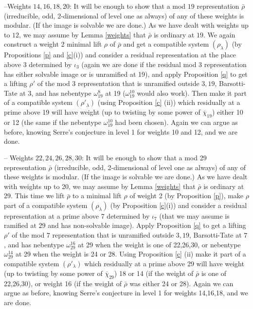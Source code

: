 \documentclass[12pt]{amsart}
\newcommand{\rhobar}{\overline{\rho}}
\def\rhobar{ {\bar {\rho} } }
\def\rhob{ {\bar {\rho} } }
\begin{document}
--Weights $14,16,18,20$: It will be enough to show that a mod $19$ representation $\rhob$ 
(irreducible, odd, $2$-dimensional of level one as always) of any of these weights is modular. (If the image is solvable we are done.) As we have 
dealt with weights up to $12$, we may assume by Lemma \ref{weights} that $\rhob$ is ordinary at $19$.
We again construct a weight 2 minimal lift $\rho$ of $\rhobar$ and get a compatible system $(\rho_{\lambda})$ (by Propositions \ref{p} and \ref{c}(i)) and consider a residual representation at the place above $3$
determined by $\iota_3$ (again we are done if the residual mod 3 representation has either solvable image or is unramified at 19), and apply Proposition \ref{q}
to get a lifting $\rho'$ of the mod 3 representation  that is unramified outside $3,19$, Barsotti-Tate at 3, and has nebentype
$\omega_{19}^8$ at 19 ($\omega_{19}^{10}$ would also work). Then make it part of a compatible system $(\rho'_{\lambda})$ (using Proposition \ref{c} (ii)) 
which residually at a prime above 19 will 
have weight (up to twisting by some power of $\overline \chi_{19}$) either 10 or 12 (the same if the nebentype $\omega_{19}^{10}$ had been chosen). Again we can argue as 
before, knowing Serre's conjecture in level 1 for weights 10 and 12,  and we are done.


-- Weights $22,24,26,28,30$: It will be enough to show that a mod 29 representation $\rhob$ (irreducible, odd, 2-dimensional of level one as always) of any of these weights is modular. (If the image is solvable we are done.) As we have dealt with weights up to 20, 
we may assume by Lemma \ref{weights} that $\rhob$ is ordinary at 29.
This time we lift $\rhobar$ to a minimal lift $\rho$ of weight 2
(by Proposition \ref{p}), make $\rho$ part of 
a  compatible system $(\rho_{\lambda})$ 
(by Proposition \ref{c}(i)) and 
consider a residual representation at a prime above 7 determined by $\iota_7$
(that we may assume is ramified at $29$ and has non-solvable image). Apply Proposition \ref{q}
to get a lifting $\rho'$ of the mod $7$ representation  that is unramified outside $3,19$, Barsotti-Tate at $7$, and has nebentype
$\omega_{29}^{16}$ at 29 when the weight is one of 22,26,30, or nebentype
$\omega_{29}^{14}$ at 29 when the weight is 24 or 28. Using Proposition \ref{c} (ii)
make it part of a compatible system $(\rho'_{\lambda})$ which residually at a prime above 29 will have weight (up to twisting by some power of $\overline \chi_{29}$) 18 or 14 (if the 
weight of $\rhobar$ is one of  22,26,30), or weight 16 (if the weight of $\rhobar$ was either 24 or 28). Again we can argue as 
before, knowing Serre's conjecture in level 1 for weights 14,16,18,  and we are done.
\end{document}
